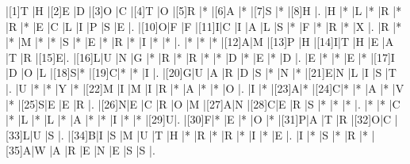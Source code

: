 \vspace{0.5em}
\begin{Puzzle}{15}{15}
|[1]T |H |[2]E |D    |[3]O |C     |[4]T |O    |[5]R |*    |[6]A |*    |[7]S |* |[8]H |.
|H    |* |L    |*    |R    |*     |R    |*    |E    |C    |L    |I    |P    |S |E    |.
|[10]O|F |F    |[11]I|C    |I     |A    |L    |S    |*    |F    |*    |R    |* |X    |.
|R    |* |*    |M    |*    |*     |S    |*    |E    |*    |R    |*    |I    |* |*    |.
|*    |* |*    |[12]A|M    |[13]P |H    |[14]I|T    |H    |E    |A    |T    |R |[15]E|.
|[16]L|U |N    |G    |*    |R     |*    |R    |*    |*    |D    |*    |E    |* |D    |.
|E    |* |*    |E    |*    |[17]I |D    |O    |L    |[18]S|*    |[19]C|*    |* |I    |.
|[20]G|U |A    |R    |D    |S     |*    |N    |*    |[21]E|N    |L    |I    |S |T    |.
|U    |* |*    |Y    |*    |[22]M |I    |M    |I    |R    |*    |A    |*    |* |O    |.
|I    |* |[23]A|*    |[24]C|*     |*    |A    |*    |V    |*    |[25]S|E    |E |R    |.
|[26]N|E |C    |R    |O    |M     |[27]A|N    |[28]C|E    |R    |S    |*    |* |*    |.
|*    |* |C    |*    |L    |*     |L    |*    |A    |*    |*    |I    |*    |* |[29]U|.
|[30]F|* |E    |*    |O    |*     |[31]P|A    |T    |R    |[32]O|C    |[33]L|U |S    |.
|[34]B|I |S    |M    |U    |T     |H    |*    |R    |*    |R    |*    |I    |* |E    |.
|I    |* |S    |*    |R    |*     |[35]A|W    |A    |R    |E    |N    |E    |S |S    |.
\end{Puzzle}\par
